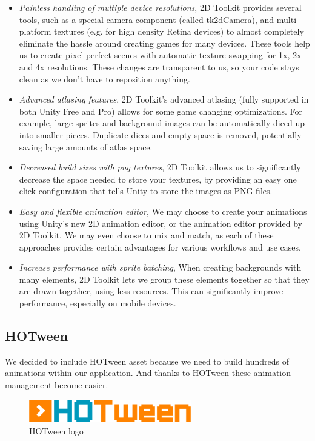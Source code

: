 \begin{itemize}
\item \textit{Painless handling of multiple device resolutions}, 2D Toolkit provides several tools, such as a special camera component (called tk2dCamera), and multi platform textures (e.g. for high density Retina devices) to almost completely eliminate the hassle around creating games for many devices.
These tools help us to create pixel perfect scenes with automatic texture swapping for 1x, 2x and 4x resolutions. These changes are transparent to us, so your code stays clean as we don't have to reposition anything.
\item \textit{Advanced atlasing features}, 2D Toolkit's advanced atlasing (fully supported in both Unity Free and Pro) allows for some game changing optimizations. For example, large sprites and background images can be automatically diced up into smaller pieces. Duplicate dices and empty space is removed, potentially saving large amounts of atlas space.
\item \textit{Decreased build sizes with png textures}, 2D Toolkit allows us to significantly decrease the space needed to store your textures, by providing an easy one click configuration that tells Unity to store the images as PNG files.
\item \textit{Easy and flexible animation editor}, We may choose to create your animations using Unity's new 2D animation editor, or the animation editor provided by 2D Toolkit. We may even choose to mix and match, as each of these approaches provides certain advantages for various workflows and use cases.
\item \textit{Increase performance with sprite batching}, When creating backgrounds with many elements, 2D Toolkit lets we group these elements together so that they are drawn together, using less resources. This can significantly improve performance, especially on mobile devices.
\end{itemize}

\subsection{HOTween}
\label{subsec:hotween}
We decided to include HOTween asset because we need to build hundreds of animations within our application. And thanks to HOTween these animation management become easier.

\begin{figure}[h]
\centering
\includegraphics[width=200pt]{graphics/enabling-tech/hotween_logo.png}
\caption{HOTween logo}
\label{fig:hotween_logo}
\end{figure}

